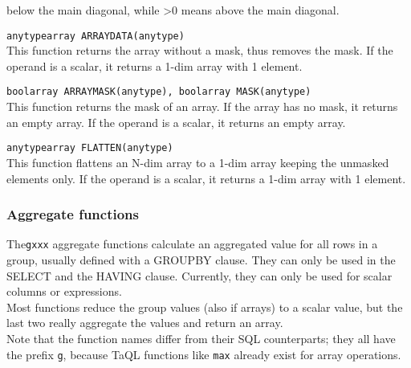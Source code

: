 \begin{description}
    below the main diagonal, while >0 means above the main diagonal.
 \item[] \texttt{anytypearray ARRAYDATA(anytype)}\\
    This function returns the array without a mask, thus removes the mask.
    If the operand is a scalar, it returns a 1-dim array with 1 element.
  \item[] \texttt{boolarray ARRAYMASK(anytype), boolarray MASK(anytype)}\\
    This function returns the mask of an array. If the array has no
    mask, it returns an empty array.
    If the operand is a scalar, it returns an empty array.
  \item[] \texttt{anytypearray FLATTEN(anytype)}\\
    This function flattens an N-dim array to a 1-dim array keeping the
    unmasked elements only.
    If the operand is a scalar, it returns a 1-dim array with 1 element.
\end{description}

\subsubsection{\label{TAQL:AGGRFUNC}Aggregate functions}
The\texttt{gxxx} aggregate functions calculate an aggregated value
for all rows in a group, usually defined with a GROUPBY clause.
They can only be used in the SELECT and the HAVING clause. Currently,
they can only be used for scalar columns or expressions.
\\Most functions reduce the group values (also if arrays) to a scalar
value, but the last two really aggregate the values and return an array. 
\\Note that the function names differ from their SQL counterparts;
they all have the prefix \texttt{g}, because TaQL functions like
\texttt{max} already exist for array operations.

